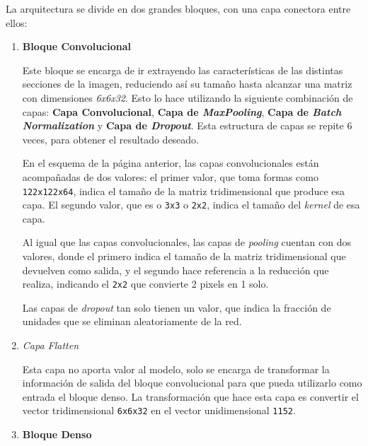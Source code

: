 \documentclass{uc3mpracticas}
\begin{document}
  \vspace{2mm}

  La arquitectura se divide en dos grandes bloques, con una capa conectora entre ellos:

  \begin{enumerate}
    \item \textbf{Bloque Convolucional}

    Este bloque se encarga de ir extrayendo las características de las distintas secciones de la imagen, reduciendo así su tamaño hasta alcanzar una matriz con dimensiones \textit{6x6x32}. Esto lo hace utilizando la siguiente combinación de capas: \textbf{Capa Convolucional}, \textbf{Capa de \textit{MaxPooling}}, \textbf{Capa de \textit{Batch Normalization}} y \textbf{Capa de \textit{Dropout}}. Esta estructura de capas se repite 6 veces, para obtener el resultado deseado.

    \vspace{2mm}

    En el esquema de la página anterior, las capas convolucionales están acompañadas de dos valores: el primer valor, que toma formas como \texttt{122x122x64}, indica el tamaño de la matriz tridimensional que produce esa capa. El segundo valor, que es o \texttt{3x3} o  \texttt{2x2}, indica el tamaño del \textit{kernel} de esa capa.

    \vspace{1mm}

    Al igual que las capas convolucionales, las capas de \textit{pooling} cuentan con dos valores, donde el primero indica el tamaño de la matriz tridimensional que devuelven como salida, y el segundo hace referencia a la reducción que realiza, indicando el \texttt{2x2} que convierte 2 pixels en 1 solo.

    \vspace{1mm}

    Las capas de \textit{dropout} tan solo tienen un valor, que indica la fracción de unidades que se eliminan aleatoriamente de la red.

    \item \textit{Capa Flatten}

    Esta capa no aporta valor al modelo, solo se encarga de transformar la información de salida del bloque convolucional para que pueda utilizarlo como entrada el bloque denso. La transformación que hace esta capa es convertir el vector tridimensional \texttt{6x6x32} en el vector unidimensional \texttt{1152}.

    \item \textbf{Bloque Denso}


\end{enumerate}
\end{document}
